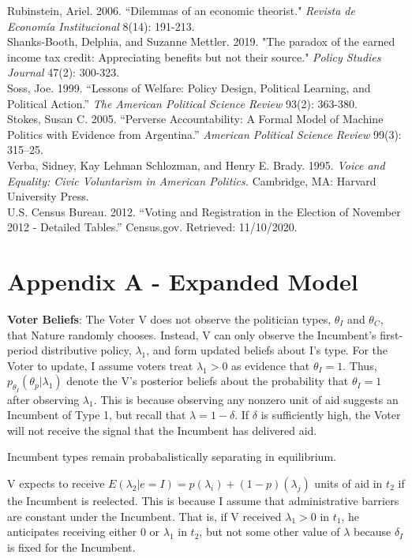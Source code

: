 \documentclass[12pt]{paper}
\begin{document}
\begin{hangparas}{.25in}{1}
Rubinstein, Ariel. 2006. ``Dilemmas of an economic theorist." \textit{Revista de Economía Institucional} 8(14): 191-213.
\\

Shanks‐Booth, Delphia, and Suzanne Mettler. 2019. "The paradox of the earned income tax credit: Appreciating benefits but not their source." \textit{Policy Studies Journal} 47(2): 300-323.
\\

Soss, Joe. 1999. ``Lessons of Welfare: Policy Design, Political Learning, and Political Action.” \textit{The American Political Science Review} 93(2): 363-380.
\\

Stokes, Susan C. 2005. ``Perverse Accountability: A Formal Model of Machine Politics with Evidence from Argentina.” \textit{American Political Science Review } 99(3): 315–25.
\\

Verba, Sidney, Kay Lehman Schlozman, and Henry E. Brady. 1995. \textit{Voice and Equality: Civic Voluntarism in American Politics.} Cambridge, MA: Harvard University Press.
\\

U.S. Census Bureau. 2012. ``Voting and Registration in the Election of November 2012 - Detailed Tables.” Census.gov. Retrieved: 11/10/2020.
\end{hangparas}
\clearpage


\section*{Appendix A - Expanded Model}
\textbf{Voter Beliefs}: The Voter V does not observe the politician types, $\theta_I$ and $\theta_C$, that Nature randomly chooses. Instead, V can only observe the Incumbent's first-period distributive policy,  $\lambda_1$, and form updated beliefs about I’s type.  For the Voter to update, I assume voters treat $\lambda_1 > 0$ as evidence that $\theta_I = 1$. Thus, $p_{\theta_I} (\theta_p | \lambda_1 )$ denote the V’s posterior beliefs about the probability that $\theta_I = 1$ after observing $\lambda_1$. This is because observing any nonzero unit of aid suggests an Incumbent of Type 1, but recall that $\lambda = 1 - \delta$. If $\delta$ is sufficiently high, the Voter will not receive the signal that the Incumbent has delivered aid.

Incumbent types remain probabalistically separating in equilibrium.

V expects to receive $E(\lambda_2 | e=I) = p(\lambda_i) + (1-p)(\lambda_j)$ units of aid in $t_2$ if the Incumbent is reelected. This is because I assume that administrative barriers are constant under the Incumbent. That is, if V received $\lambda_1 > 0$ in $t_1$, he anticipates receiving either $0$ or $\lambda_1$ in $t_2$, but not some other value of $\lambda$ because $\delta_I$ is fixed for the Incumbent.
\end{document}
